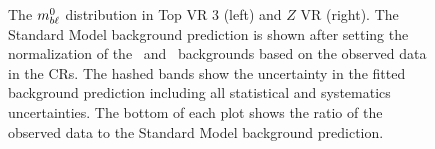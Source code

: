 \begin{figure}
  \centering
  \caption{
    The $m_{b\ell}^0$ distribution in Top VR 3 (left) and $Z$ VR (right).
    The Standard Model background prediction is shown after setting the
    normalization of the \TTBAR\ and \ZGAMMAJETS\ backgrounds based on the
    observed data in the CRs. The hashed bands show the uncertainty in the
    fitted background prediction including all statistical and systematics
    uncertainties.
    The bottom of each plot shows the ratio of the observed data to the
    Standard Model background prediction.
  }
  \label{fig:mbl_vr}
\end{figure}

